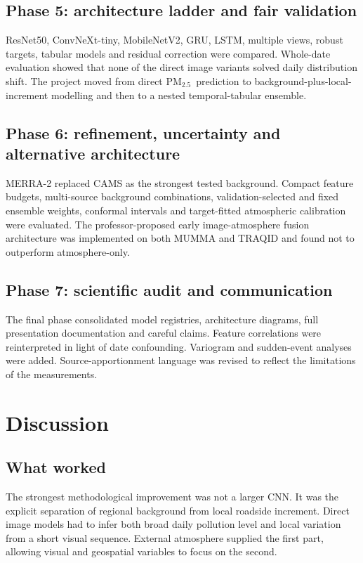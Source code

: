 \documentclass[11pt,a4paper,oneside]{report}
\newcommand{\pmtwo}{PM$_{2.5}$}
\begin{document}
\section{Phase 5: architecture ladder and fair validation}
ResNet50, ConvNeXt-tiny, MobileNetV2, GRU, LSTM, multiple views, robust targets,
tabular models and residual correction were compared. Whole-date evaluation
showed that none of the direct image variants solved daily distribution shift.
The project moved from direct \pmtwo\ prediction to background-plus-local-increment
modelling and then to a nested temporal-tabular ensemble.

\section{Phase 6: refinement, uncertainty and alternative architecture}
MERRA-2 replaced CAMS as the strongest tested background. Compact feature
budgets, multi-source background combinations, validation-selected and fixed
ensemble weights, conformal intervals and target-fitted atmospheric calibration
were evaluated. The professor-proposed early image-atmosphere fusion architecture
was implemented on both MUMMA and TRAQID and found not to outperform
atmosphere-only.

\section{Phase 7: scientific audit and communication}
The final phase consolidated model registries, architecture diagrams, full
presentation documentation and careful claims. Feature correlations were
reinterpreted in light of date confounding. Variogram and sudden-event analyses
were added. Source-apportionment language was revised to reflect the limitations
of the measurements.

\chapter{Discussion}

\section{What worked}
The strongest methodological improvement was not a larger CNN. It was the
explicit separation of regional background from local roadside increment.
Direct image models had to infer both broad daily pollution level and local
variation from a short visual sequence. External atmosphere supplied the first
part, allowing visual and geospatial variables to focus on the second.
\end{document}
